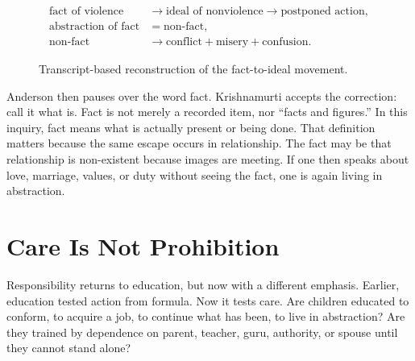 \documentclass[11pt,oneside]{book}
\begin{document}
\begin{align}
\text{fact of violence}
&\longrightarrow
\text{ideal of nonviolence}
\longrightarrow
\text{postponed action},\\
\text{abstraction of fact}
&=
\text{non-fact},\\
\text{non-fact}
&\longrightarrow
\text{conflict}+\text{misery}+\text{confusion}.
\end{align}

\begin{figure}
\centering
{}

Transcript-based reconstruction of the fact-to-ideal movement.
\end{figure}

Anderson then pauses over the word fact. Krishnamurti accepts the correction: call it what is. Fact is not merely a recorded item, nor ``facts and figures.'' In this inquiry, fact means what is actually present or being done. That definition matters because the same escape occurs in relationship. The fact may be that relationship is non-existent because images are meeting. If one then speaks about love, marriage, values, or duty without seeing the fact, one is again living in abstraction.

\section{Care Is Not Prohibition}

Responsibility returns to education, but now with a different emphasis. Earlier, education tested action from formula. Now it tests care. Are children educated to conform, to acquire a job, to continue what has been, to live in abstraction? Are they trained by dependence on parent, teacher, guru, authority, or spouse until they cannot stand alone?
\end{document}
